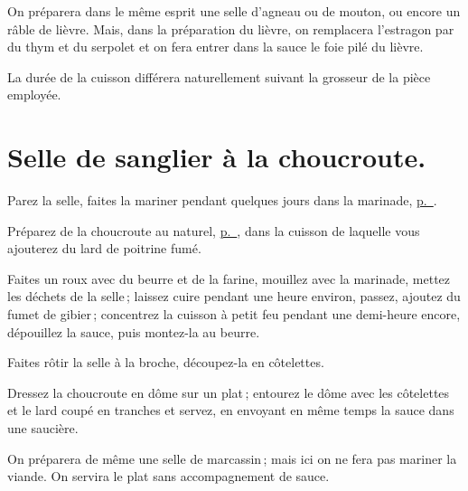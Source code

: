 \sk

On préparera dans le même esprit une selle d'agneau ou de mouton, ou encore un
râble de lièvre. Mais, dans la préparation du lièvre, on remplacera l'estragon
par du thym et du serpolet et on fera entrer dans la sauce le foie pilé du
lièvre.

La durée de la cuisson différera naturellement suivant la grosseur de la pièce
employée.

\section*{\centering Selle de sanglier à la choucroute.}
{}

Parez la selle, faites la mariner pendant quelques jours dans la marinade,
\hyperlink{p0514}{p. \pageref{pg0514}}.

Préparez de la choucroute au naturel, \hyperlink{p0791}{p. \pageref{pg0791}}, dans
la cuisson de laquelle vous ajouterez du lard de poitrine fumé.

Faites un roux avec du beurre et de la farine, mouillez avec la marinade,
mettez les déchets de la selle ; laissez cuire pendant une heure environ,
passez, ajoutez du fumet de gibier ; concentrez la cuisson à petit feu pendant
une demi-heure encore, dépouillez la sauce, puis montez-la au beurre.

Faites rôtir la selle à la broche, découpez-la en côtelettes.

Dressez la choucroute en dôme sur un plat ; entourez le dôme avec les
côtelettes et le lard coupé en tranches et servez, en envoyant en même temps la
sauce dans une saucière.

\sk

On préparera de même une selle de marcassin ; mais ici on ne fera pas mariner
la viande. On servira le plat sans accompagnement de sauce.
